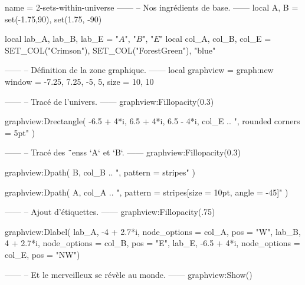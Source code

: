 \documentclass{standalone}
\begin{document}
\begin{luadraw}{name = 2-sets-within-universe}
------
-- Nos ingrédients de base.
------
local A, B = set(-1.75,90), set(1.75, -90)

local lab_A, lab_B, lab_E = "$A$", "$B$", "$E$"
local col_A, col_B, col_E = SET_COL("Crimson"), SET_COL("ForestGreen"), "blue"

------
-- Définition de la zone graphique.
------
local graphview = graph:new{
  window = {-7.25, 7.25, -5, 5},
  size   = {10, 10}
}

------
-- Tracé de l'univers.
------
graphview:Fillopacity(0.3)

graphview:Drectangle(
  -6.5 + 4*i, 6.5 + 4*i, 6.5 - 4*i,
  col_E .. ", rounded corners = 5pt"
)

------
-- Tracé des ¨enss `A` et `B`.
------
graphview:Fillopacity(0.3)

graphview:Dpath(
  B,
  col_B .. ", pattern = stripes"
)

graphview:Dpath(
  A,
  col_A .. ", pattern = {stripes[size = 10pt, angle = -45]}"
)

------
-- Ajout d'étiquettes.
------
graphview:Fillopacity(.75)

graphview:Dlabel(
  lab_A, -4 + 2.7*i, {node_options = col_A, pos = "W"},
  lab_B,  4 + 2.7*i, {node_options = col_B, pos = "E"},
  lab_E, -6.5 + 4*i, {node_options = col_E, pos = "NW"})

------
-- Et le merveilleux se révèle au monde.
------
graphview:Show()
\end{luadraw}
\end{document}
